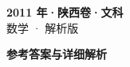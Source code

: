 \documentclass[zihao=-4, a4paper]{ctexart}
\begin{document}
\begin{center}
  {\Large\bfseries 2011 年·陕西卷·文科}\\[4pt]
  {\large 数学 · 解析版}
\end{center}
\medskip
{}

\clearpage
{}
\begin{center}{\Large\bfseries 参考答案与详细解析}\end{center}
\medskip

\end{document}
